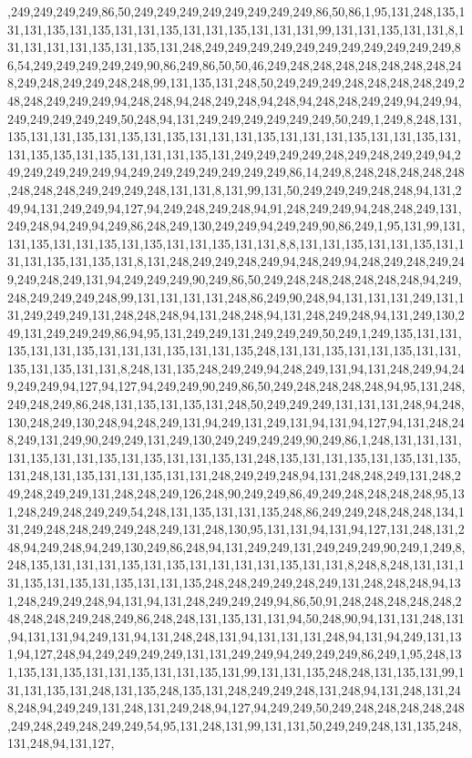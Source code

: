 ,249,249,249,249,86,50,249,249,249,249,249,249,249,249,86,50,86,1,95,131,248,135,131,131,135,131,135,131,131,135,131,131,135,131,131,131,99,131,131,135,131,131,8,131,131,131,131,135,131,135,131,248,249,249,249,249,249,249,249,249,249,249,249,86,54,249,249,249,249,249,90,86,249,86,50,50,46,249,248,248,248,248,248,248,248,248,249,248,249,249,248,248,99,131,135,131,248,50,249,249,249,248,248,248,248,249,248,248,249,249,249,94,248,248,94,248,249,248,94,248,94,248,248,249,249,94,249,94,249,249,249,249,249,50,248,94,131,249,249,249,249,249,249,50,249,1,249,8,248,131,135,131,131,135,131,135,131,135,131,131,131,135,131,131,131,135,131,131,135,131,131,135,135,131,135,131,131,131,135,131,249,249,249,249,248,249,248,249,249,94,249,249,249,249,249,94,249,249,249,249,249,249,249,86,14,249,8,248,248,248,248,248,248,248,248,249,249,249,248,131,131,8,131,99,131,50,249,249,249,248,248,94,131,249,94,131,249,249,94,127,94,249,248,249,248,94,91,248,249,249,94,248,248,249,131,249,248,94,249,94,249,86,248,249,130,249,249,94,249,249,90,86,249,1,95,131,99,131,131,135,131,131,135,131,135,131,131,135,131,131,8,8,131,131,135,131,131,135,131,131,131,135,131,135,131,8,131,248,249,249,248,249,94,248,249,94,248,249,248,249,249,249,248,249,131,94,249,249,249,90,249,86,50,249,248,248,248,248,248,248,94,249,248,249,249,249,248,99,131,131,131,131,248,86,249,90,248,94,131,131,131,249,131,131,249,249,249,131,248,248,248,94,131,248,248,94,131,248,249,248,94,131,249,130,249,131,249,249,249,86,94,95,131,249,249,131,249,249,249,50,249,1,249,135,131,131,135,131,131,135,131,131,131,135,131,131,135,248,131,131,135,131,131,135,131,131,135,131,135,131,131,8,248,131,135,248,249,249,94,248,249,131,94,131,248,249,94,249,249,249,94,127,94,127,94,249,249,90,249,86,50,249,248,248,248,248,94,95,131,248,249,248,249,86,248,131,135,131,135,131,248,50,249,249,249,131,131,131,248,94,248,130,248,249,130,248,94,248,249,131,94,249,131,249,131,94,131,94,127,94,131,248,248,249,131,249,90,249,249,131,249,130,249,249,249,249,90,249,86,1,248,131,131,131,131,135,131,131,135,131,135,131,131,135,131,248,135,131,131,135,131,135,131,135,131,248,131,135,131,131,135,131,131,248,249,249,248,94,131,248,248,249,131,248,249,248,249,249,131,248,248,249,126,248,90,249,249,86,49,249,248,248,248,248,95,131,248,249,248,249,249,54,248,131,135,131,131,135,248,86,249,249,248,248,248,134,131,249,248,248,249,249,248,249,131,248,130,95,131,131,94,131,94,127,131,248,131,248,94,249,248,94,249,130,249,86,248,94,131,249,249,131,249,249,249,90,249,1,249,8,248,135,131,131,131,135,131,135,131,131,131,131,135,131,131,8,248,8,248,131,131,131,135,131,135,131,135,131,131,135,248,248,249,249,248,249,131,248,248,248,94,131,248,249,249,248,94,131,94,131,248,249,249,249,94,86,50,91,248,248,248,248,248,248,248,248,249,248,249,86,248,248,131,135,131,131,94,50,248,90,94,131,131,248,131,94,131,131,94,249,131,94,131,248,248,131,94,131,131,131,248,94,131,94,249,131,131,94,127,248,94,249,249,249,249,131,131,249,249,94,249,249,249,86,249,1,95,248,131,135,131,135,131,131,135,131,131,135,131,99,131,131,135,248,248,131,135,131,99,131,131,135,131,248,131,135,248,135,131,248,249,249,248,131,248,94,131,248,131,248,248,94,249,249,131,248,131,249,248,94,127,94,249,249,50,249,248,248,248,248,248,249,248,249,248,249,249,54,95,131,248,131,99,131,131,50,249,249,248,131,135,248,131,248,94,131,127,